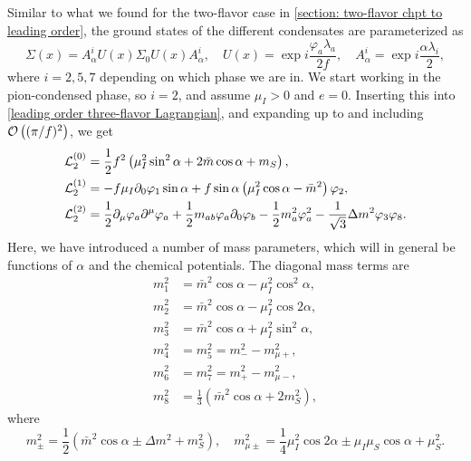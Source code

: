 Similar to what we found for the two-flavor case in \autoref{section: two-flavor chpt to leading order}, the ground states of the different condensates are parameterized as
%
\begin{equation}
    \Sigma(x) = A^i_\alpha U(x) \Sigma_0 U(x) A^i_\alpha, \quad
    U(x) = \exp{i \frac{\varphi_a \lambda_a}{2 f}}, \quad
    A_\alpha^i = \exp{i \frac{\alpha \lambda_i}{2}},
\end{equation}
%
where $i = 2, 5, 7$ depending on which phase we are in.
We start working in the pion-condensed phase, so $i = 2$, and assume $\mu_I > 0$ and $e = 0$.
Inserting this into \autoref{leading order three-flavor Lagrangian}, and expanding up to and including $\mathcal O\left((\pi/f)^2\right)$, we get
%
\begin{align}
    \label{static three-flavor Lagrangian}
    \mathcal{L}_2^{(0)} 
    &=
    \frac{1}{2} f^2
    \left(
        \mu_I^2 \sin^2\alpha
        + 2\bar m \cos\alpha
        + m_S
    \right), \\
    \label{linear three-flavor Lagrangian}
    \mathcal{L}_2^{(1)}
    &=
    -f \mu_I \partial_0 \varphi_1 \sin\alpha
    + f \sin\alpha
    \left(
        \mu_I^2\cos\alpha - \bar m^2
    \right)\varphi_2, \\
    \label{quadratic three-flavor Lagrangian}
    \mathcal{L}_2^{(2)} 
    &= 
    \frac{1}{2}\partial_\mu \varphi_a \partial^\mu \varphi_a
    + \frac{1}{2} m_{ab} \varphi_a\partial_0\varphi_b
    - \frac{1}{2} m_a^2 \varphi_a^2
    - \frac{1}{\sqrt{3}} \Delta m^2 \varphi_3 \varphi_8.
\end{align}
%
Here, we have introduced a number of mass parameters, which will in general be functions of $\alpha$ and the chemical potentials.
The diagonal mass terms are
%
\begingroup
\allowdisplaybreaks
\begin{align}
    \label{m1}
    m_1^2 &=  \bar m^2\cos\alpha - \mu_I^2 \cos^2\alpha,\\
    m_2^2 &= \bar m^2\cos\alpha - \mu_I^2 \cos2\alpha, \\
    m_3^2 &= \bar m^2\cos\alpha + \mu_I^2 \sin^2\alpha, \\
    m_4^2 &= m_5^2 = m_-^2 - m_{\mu+}^2, \\
    m_6^2 &= m_7^2 = m_+^2 - m^2_{\mu-}, \\
    \label{m8}
    m_8^2 &= \frac{1}{3} (\bar m^2 \cos\alpha + 2 m_S^2),
\end{align}
\endgroup
%
where
%
\begin{equation}
    \label{mass terms in pion condensate}
    m_\pm^2 = \frac{1}{2} (\bar m^2 \cos\alpha \pm \Delta m^2 + m_S^2),
    \quad
    m^2_{\mu\pm } = \frac{1}{4}\mu_I^2 \cos2\alpha \pm \mu_I\mu_S \cos\alpha + \mu_S^2.
\end{equation}
